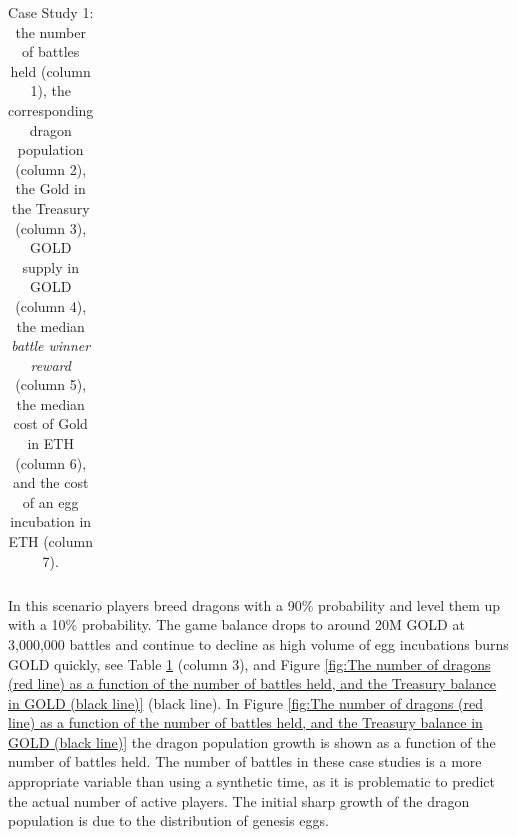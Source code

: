 \documentclass[12pt]{article}
\begin{document}
{\begin{table}[H]
\begin{tabular}{p{0.6in}p{0.64in}p{0.55in}p{0.6in}p{0.99in}p{0.94in}p{0.9in}}
\end{tabular}\caption{Case Study 1: the number of battles held (column 1), the corresponding dragon population (column 2), the Gold in the Treasury (column 3), GOLD supply in GOLD (column 4), the median {\it battle winner reward} (column 5), the median cost of Gold in ETH (column 6), and the cost of an egg incubation in ETH (column 7).}
\label{tab:Table showing the number of battles held (column 1), the corresponding dragon population (column 2), the Gold in the Treasury (column 3), the median battle winner reward (column 4), the median cost of Gold in $ (column 5), and the cost of an egg incubation (column 6).  This information is provided for the three different cases studied below. }

 \end{table}




In this scenario players breed dragons with a 90$\%$  probability and level them up with a 10$\%$  probability. The game balance drops to around 20M GOLD at 3,000,000 battles and continue to decline as high volume of egg incubations burns GOLD quickly, see  Table \ref{tab:Table showing the number of battles held (column 1), the corresponding dragon population (column 2), the Gold in the Treasury (column 3), the median battle winner reward (column 4), the median cost of Gold in $ (column 5), and the cost of an egg incubation (column 6).  This information is provided for the three different cases studied below. } (column 3), and Figure \ref{fig:The number of dragons (red line) as a function of the number of battles held, and the Treasury balance in GOLD (black line)} (black line). In Figure \ref{fig:The number of dragons (red line) as a function of the number of battles held, and the Treasury balance in GOLD (black line)} the dragon population growth is shown as a function of the number of battles held. The number of battles in these case studies is a more appropriate variable than using a synthetic time, as it is problematic to predict the actual number of active players. The initial sharp growth of the dragon population is due to the distribution of genesis eggs.\par




}
\end{document}
